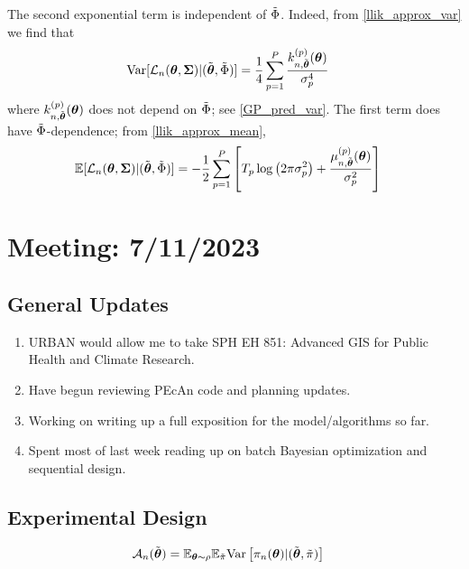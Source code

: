 \documentclass[12pt]{article}
\begin{document}
The second exponential term is independent of $\tilde{\Phi}$. Indeed, from \ref{llik_approx_var} we find that
\begin{align*}
\mathrm{Var}[\mathcal{L}_{n}(\boldsymbol{\theta}, \boldsymbol{\Sigma}) | (\tilde{\boldsymbol{\theta}}, \tilde{\Phi})] &= \frac{1}{4} \sum_{p = 1}^{P} \frac{k_{n, \tilde{\boldsymbol{\theta}}}^{(p)}(\boldsymbol{\theta})}{\sigma_{p}^4}
\end{align*}
where $k_{n, \tilde{\boldsymbol{\theta}}}^{(p)}(\boldsymbol{\theta})$ does not depend on $\tilde{\Phi}$; see \ref{GP_pred_var}. The first term does have $\tilde{\Phi}$-dependence; from \ref{llik_approx_mean},
\begin{align*}
\mathbb{E}[\mathcal{L}_{n}(\boldsymbol{\theta}, \boldsymbol{\Sigma}) | (\tilde{\boldsymbol{\theta}}, \tilde{\Phi})] &= -\frac{1}{2} \sum_{p = 1}^{P} \left[T_{p} \log\left(2\pi \sigma_{p}^2 \right) + \frac{\mu_{n, \tilde{\boldsymbol{\theta}}}^{(p)}(\boldsymbol{\theta})}{\sigma_{p}^2} \right]
\end{align*}



\section{Meeting: 7/11/2023}

\subsection{General Updates}
\begin{enumerate}
\item URBAN would allow me to take SPH EH 851: Advanced GIS for Public Health and Climate Research. 
\item Have begun reviewing PEcAn code and planning updates. 
\item Working on writing up a full exposition for the model/algorithms so far. 
\item Spent most of last week reading up on batch Bayesian optimization and sequential design. 
\end{enumerate}

\subsection{Experimental Design}
\begin{align*}
\mathcal{A}_{n}(\tilde{\boldsymbol{\theta}}) &= \mathbb{E}_{\boldsymbol{\theta} \sim \rho} \mathbb{E}_{\tilde{\pi}} \mathrm{Var}\left[\pi_{n}(\boldsymbol{\theta}) | (\tilde{\boldsymbol{\theta}}, \tilde{\pi}) \right] 
\end{align*}
\end{document}
